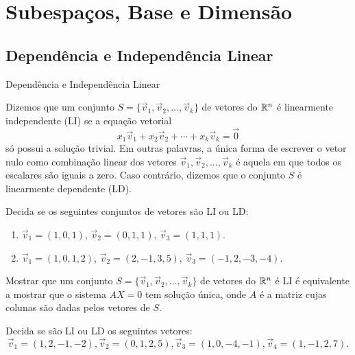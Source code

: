 \section{Subespaços, Base e Dimensão}

\subsection*{Dependência e Independência Linear}

\begin{frame}[label=lild]{Dependência e Independência Linear}
\begin{defin}

Dizemos que um conjunto $S=\{\vec{v}_1,\vec{v}_2,\ldots,\vec{v}_k\}$ de vetores do $\mathbb{R}^n$ é {\color{blue} linearmente independente (LI)} se a equação vetorial
\[x_1\vec{v}_1+x_2\vec{v}_2+\cdots +x_k\vec{v}_k=\vec{0}\]
só possui a solução trivial. Em outras palavras, a única forma de escrever o vetor nulo como combinação linear dos vetores $\vec{v}_1,\vec{v}_2,\ldots, \vec{v}_k$ é aquela em que todos os escalares são iguais a zero. Caso contrário, dizemos que o conjunto $S$ é {\color{blue}linearmente dependente (LD)}.

\end{defin}
	
\end{frame}

\begin{frame}[label=lild]{}
\begin{exe}
Decida se os seguintes conjuntos de vetores são LI ou LD:
\begin{enumerate}
\item $\vec{v}_1=(1,0,1)$, $\vec{v}_2=(0,1,1)$, $\vec{v}_3=(1,1,1)$.

\item  $\vec{v}_1=(1,0,1,2)$, $\vec{v}_2=(2,-1,3,5)$, $\vec{v}_3=(-1,2,-3,-4)$.
\end{enumerate}
\end{exe}

\begin{block}{}
Mostrar que um conjunto $S=\{\vec{v}_1,\vec{v}_2,\ldots,\vec{v}_k\}$ de vetores do $\mathbb{R}^n$ é {\color{red}LI} é equivalente a mostrar que o sistema {\color{red}$AX=0$ tem solução única}, onde $A$ é a matriz cujas {\color{red}colunas são dadas pelos vetores de $S$}.
\end{block}

\begin{exer}
Decida se são LI ou LD os seguintes vetores:
\[
\vec{v}_1=(1,2,-1,-2), \vec{v}_2=(0,1,2,5), \vec{v}_3=(1,0,-4,-1),  \vec{v}_4=(1,-1,2,7).\]
\end{exer}
	
\end{frame}



